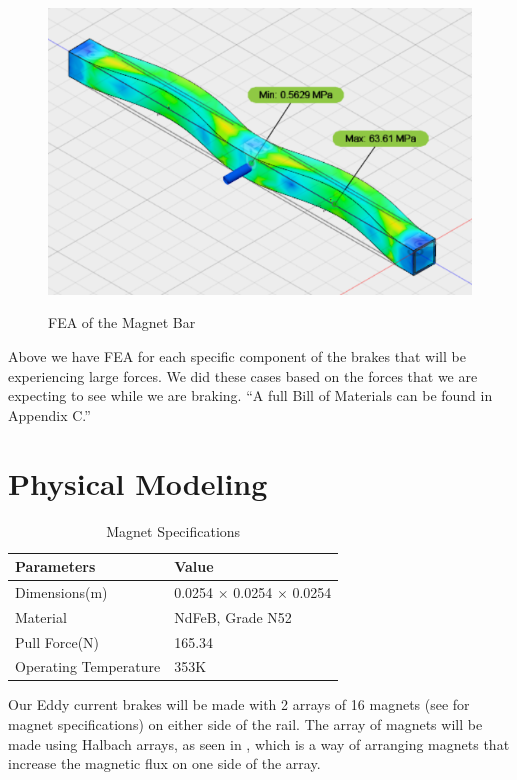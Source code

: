 \documentclass[main.tex]{subfiles}
\begin{document}
    \begin{figure}
    	\centering
        \includegraphics[width=\linewidth]{images/MagnetBarFEA}
        \label{fig:MagnetBar}
        \caption{FEA of the Magnet Bar}
    \end{figure}
    Above we have FEA for each specific component of the brakes that will be experiencing large forces. We did these cases based on the forces that we are expecting to see while we are braking.
    “A full Bill of Materials can be found in Appendix C.”

    \section{Physical Modeling}
    \begin{table}
    	\centering
    	\begin{tabular}{ll} \toprule
            Parameters & Value\\ \midrule
            Dimensions(\si{m})     & 0.0254 $\times$ 0.0254 $\times$ 0.0254 \\
            Material     & NdFeB, Grade N52   \\
            Pull Force(\si{N})     & 165.34 \\
            Operating Temperature     & 353K  \\ \bottomrule
        \end{tabular}
        \caption{Magnet Specifications}
        \label{table:magnets}
    \end{table}
    Our Eddy current brakes will be made with 2 arrays of 16 magnets (see  for magnet specifications) on either side of the rail. The array of magnets will be made using Halbach arrays, as seen in , which is a way of arranging magnets that increase the magnetic flux on one side of the array.\\
\end{document}

